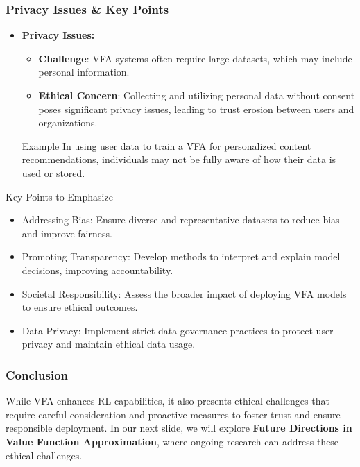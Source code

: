 \documentclass[aspectratio=169]{beamer}
\begin{document}
\begin{frame}[fragile]
    \frametitle{Privacy Issues \& Key Points}
    \begin{itemize}
        \item \textbf{Privacy Issues:}
        \begin{itemize}
            \item \textbf{Challenge}: VFA systems often require large datasets, which may include personal information.
            \item \textbf{Ethical Concern}: Collecting and utilizing personal data without consent poses significant privacy issues, leading to trust erosion between users and organizations.
        \end{itemize}
        \begin{block}{Example}
            In using user data to train a VFA for personalized content recommendations, individuals may not be fully aware of how their data is used or stored.
        \end{block}
    \end{itemize}
    \begin{block}{Key Points to Emphasize}
        \begin{itemize}
            \item Addressing Bias: Ensure diverse and representative datasets to reduce bias and improve fairness.
            \item Promoting Transparency: Develop methods to interpret and explain model decisions, improving accountability.
            \item Societal Responsibility: Assess the broader impact of deploying VFA models to ensure ethical outcomes.
            \item Data Privacy: Implement strict data governance practices to protect user privacy and maintain ethical data usage.
        \end{itemize}
    \end{block}
\end{frame}

\begin{frame}[fragile]
    \frametitle{Conclusion}
    While VFA enhances RL capabilities, it also presents ethical challenges that require careful consideration and proactive measures to foster trust and ensure responsible deployment. 
    In our next slide, we will explore \textbf{Future Directions in Value Function Approximation}, where ongoing research can address these ethical challenges.
\end{frame}
\end{document}
